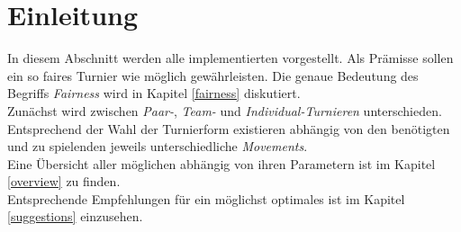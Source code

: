 \section{Einleitung}

\noindent
In diesem Abschnitt werden alle implementierten \bms vorgestellt. Als Prämisse sollen \bms ein so faires Turnier wie möglich gewährleisten. Die genaue Bedeutung des Begriffs \textit{Fairness} wird in Kapitel \ref{fairness} diskutiert.\\[.1cm]

\noindent
Zunächst wird zwischen \textit{Paar-}, \textit{Team-} und \textit{Individual-Turnieren} unterschieden.\\[.1cm]

\noindent
Entsprechend der Wahl der Turnierform existieren abhängig von den benötigten \tis und zu spielenden \bos jeweils unterschiedliche \textit{Movements}.\\[.1cm]

\noindent
Eine Übersicht aller möglichen \bms abhängig von ihren Parametern ist im Kapitel \ref{overview} zu finden.\\[.1cm]
Entsprechende Empfehlungen für ein möglichst optimales \bms ist im Kapitel \ref{suggestions} einzusehen.
